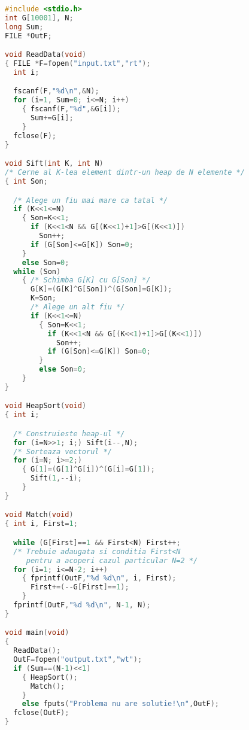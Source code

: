 \begin{lstlisting}[language=C]
#include <stdio.h>
int G[10001], N;
long Sum;
FILE *OutF;

void ReadData(void)
{ FILE *F=fopen("input.txt","rt");
  int i;

  fscanf(F,"%d\n",&N);
  for (i=1, Sum=0; i<=N; i++)
    { fscanf(F,"%d",&G[i]);
      Sum+=G[i];
    }
  fclose(F);
}

void Sift(int K, int N)
/* Cerne al K-lea element dintr-un heap de N elemente */
{ int Son;

  /* Alege un fiu mai mare ca tatal */
  if (K<<1<=N)
    { Son=K<<1;
      if (K<<1<N && G[(K<<1)+1]>G[(K<<1)])
        Son++;
      if (G[Son]<=G[K]) Son=0;
    }
    else Son=0;
  while (Son)
    { /* Schimba G[K] cu G[Son] */
      G[K]=(G[K]^G[Son])^(G[Son]=G[K]);
      K=Son;
      /* Alege un alt fiu */
      if (K<<1<=N)
        { Son=K<<1;
          if (K<<1<N && G[(K<<1)+1]>G[(K<<1)])
            Son++;
          if (G[Son]<=G[K]) Son=0;
        }
        else Son=0;
    }
}

void HeapSort(void)
{ int i;

  /* Construieste heap-ul */
  for (i=N>>1; i;) Sift(i--,N);
  /* Sorteaza vectorul */
  for (i=N; i>=2;)
    { G[1]=(G[1]^G[i])^(G[i]=G[1]);
      Sift(1,--i);
    }
}

void Match(void)
{ int i, First=1;

  while (G[First]==1 && First<N) First++;
  /* Trebuie adaugata si conditia First<N
     pentru a acoperi cazul particular N=2 */
  for (i=1; i<=N-2; i++)
    { fprintf(OutF,"%d %d\n", i, First);
      First+=(--G[First]==1);
    }
  fprintf(OutF,"%d %d\n", N-1, N);
}

void main(void)
{
  ReadData();
  OutF=fopen("output.txt","wt");
  if (Sum==(N-1)<<1)
    { HeapSort();
      Match();
    }
    else fputs("Problema nu are solutie!\n",OutF);
  fclose(OutF);
}
\end{lstlisting}
